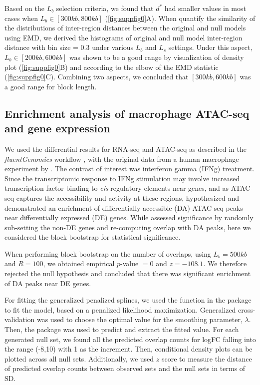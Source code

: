 \documentclass{article}
\begin{document}
Based on the $L_b$ selection criteria, we found that $d^*$ had
smaller values in most cases when $L_b \in [300kb,800kb]$
(\cref{fig:suppfig0}A). When quantify the similarity of the distributions of
inter-region distances between the original and 
null models using EMD, we derived the histograms of
original and
null model inter-region distance with bin size = 0.3 under various $L_b$ and $L_s$ settings. Under this aspect, $L_b \in [200kb,600kb]$ was
shown to be a good range by visualization of density plot
(\cref{fig:suppfig0}B) and according to the elbow of the EMD statistic
(\cref{fig:suppfig0}C). Combining two aspects, we concluded that $[300kb,600kb]$ was a good range for block length.

\subsection{Enrichment analysis of macrophage ATAC-seq and gene expression}\label{sec:splines}

We used the differential results for RNA-seq and ATAC-seq as
described in the \textit{fluentGenomics} workflow \citep{lee2020fluent}, with
the original data from a human macrophage experiment by \citet{alasoo2018shared}.
The contrast of interest was interferon gamma (IFNg) treatment. Since the
transcriptomic response to IFNg stimulation may involve increased
transcription factor binding to \textit{cis}-regulatory elements near
genes, and as ATAC-seq captures the accessibility and activity at
these regions, \citet{lee2020fluent} hypothesized and demonstrated an
enrichment of differentially accessible (DA) ATAC-seq peaks near
differentially expressed (DE) genes. While \citet{lee2020fluent}
assessed significance by randomly sub-setting the non-DE genes and
re-computing overlap with DA peaks, here we considered the block
bootstrap for statistical significance.

When performing block bootstrap on the number of overlaps,
using $L_b = 500kb$ and $R = 100$,
we obtained empirical $\textit{p}$-value $=0$ and $z = -108.1$.
We therefore rejected the null hypothesis and concluded that there was
significant enrichment of DA peaks near DE genes.

For fitting the generalized penalized splines, we used the  function in
the  package \citep{mgcv2011wood} to fit the model, based on
a penalized likelihood maximization. Generalized cross-validation
was used to choose the optimal value for the smoothing parameter,
$\lambda$. Then, the  package was used to predict and
extract the fitted value. 
For each generated null set, we found all the predicted overlap counts for logFC falling into the range (-8,10) with 1 as the increment. Then, conditional density plots can be plotted across all null sets. Additionally, we used $z$ score to measure the distance of predicted overlap counts between observed sets and the null sets in terms of SD.
\end{document}
